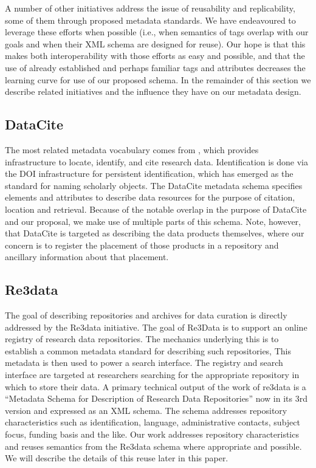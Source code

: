 A number of other initiatives address the issue of reusability and replicability, some of them through proposed metadata standards.  We have endeavoured to leverage these efforts when possible (i.e., when semantics of tags overlap with our goals and when their XML schema are designed for reuse).  Our hope is that this makes both interoperability with those efforts as easy and possible, and that the use of already established and perhaps familiar tags and attributes decreases the learning curve for use of our proposed schema.  In the remainder of this section we describe related initiatives and the influence they have on our metadata design.

\subsection{DataCite}
The most related metadata vocabulary comes from , which provides infrastructure to locate, identify, and cite research data. Identification is done via the DOI infrastructure for persistent identification, which has emerged as the standard for naming scholarly objects.  The DataCite metadata schema \parencite{DataCiteMetadataWorkingGroupDataCiteMetadataSchema2017a,DataCiteMetadataWorkingGroupDataCiteMetadataSchema2017} specifies elements and attributes to describe data resources for the purpose of citation, location and retrieval.  Because of the notable overlap in the purpose of DataCite  and our proposal, we make use of multiple parts of this schema. Note, however, that DataCite is targeted as describing the data products themselves, where our concern is to register the placement of those products in a repository and ancillary information about that placement.

\subsection{Re3data}
The goal of describing repositories and archives for data curation is directly addressed by the Re3data \parencite{RucknagelMetadataSchemaDescription2015,Re3data.Orgre3dataorgMetadata2015} initiative.  The goal of Re3Data is to support an online registry of research data repositories.   The mechanics underlying this is to establish a common metadata standard for describing such repositories, This metadata is then used to power a search interface.  The registry and search interface are targeted at researchers searching for the appropriate repository in which to store their data.
A primary technical output of the work of re3data is a ``Metadata Schema for Description of Research Data Repositories'' now in its 3rd version and expressed as an XML schema.  The schema addresses repository characteristics such as identification,   language, administrative contacts, subject focus, funding basis and the like.  Our work addresses repository characteristics and reuses semantics from the Re3data schema where appropriate and possible.  We will describe the details of this reuse later in this paper.

